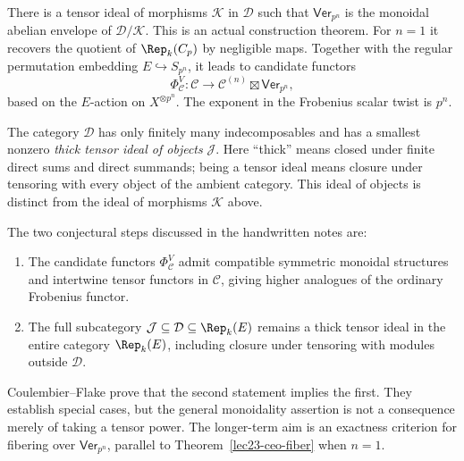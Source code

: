 There is a tensor ideal of morphisms $\mathcal K$ in $\mathcal D$ such
that $\mathsf{Ver}_{p^n}$ is the monoidal abelian envelope of
$\mathcal D/\mathcal K$. This is an actual construction theorem.
For $n=1$ it recovers the quotient of $\Rep_k(C_p)$ by negligible maps.
Together with the regular permutation embedding $E\hookrightarrow S_{p^n}$,
it leads to candidate functors
\[
 \Phi^V_{\mathcal C}:\mathcal C\longrightarrow
 \mathcal C^{(n)}\boxtimes\mathsf{Ver}_{p^n},
\]
based on the $E$-action on $X^{\otimes p^n}$. The exponent in the
Frobenius scalar twist is $p^n$.

The category $\mathcal D$ has only finitely many indecomposables and has
a smallest nonzero \emph{thick tensor ideal of objects} $\mathcal J$.
Here ``thick'' means closed under finite direct sums and direct summands;
being a tensor ideal means closure under tensoring with every object of
the ambient category. This ideal of objects is distinct from the ideal
of morphisms $\mathcal K$ above.

The two conjectural steps discussed in the handwritten notes are:
\begin{enumerate}
 \item The candidate functors $\Phi^V_{\mathcal C}$ admit compatible
 symmetric monoidal structures and intertwine tensor functors in
 $\mathcal C$, giving higher analogues of the ordinary Frobenius functor.
 \item The full subcategory $\mathcal J\subseteq\mathcal D\subseteq
 \Rep_k(E)$ remains a thick tensor ideal in the entire category
 $\Rep_k(E)$, including closure under tensoring with modules outside
 $\mathcal D$.
\end{enumerate}
Coulembier--Flake prove that the second statement implies the first.
They establish special cases, but the general monoidality assertion is
not a consequence merely of taking a tensor power. The longer-term aim
is an exactness criterion for fibering over $\mathsf{Ver}_{p^n}$,
parallel to Theorem~\ref{lec23-ceo-fiber} when $n=1$.
